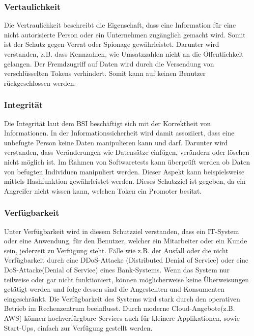 \subsubsection{Vertaulichkeit}
Die Vertraulichkeit beschreibt die Eigenschaft, dass eine Information für eine nicht autorisierte Person oder ein Unternehmen zugänglich gemacht wird. Somit ist der Schutz gegen Verrat oder Spionage gewährleistet. Darunter wird verstanden, z.B. dass Kennzahlen, wie Umsatzzahlen nicht an die Öffentlichkeit gelangen. 
Der Fremdzugriff auf Daten wird durch die Versendung von verschlüsselten Tokens verhindert. Somit kann auf keinen Benutzer rückgeschlossen werden.

\subsubsection{Integrität}
Die Integrität laut dem BSI beschäftigt sich mit der Korrektheit von Informationen. In der Informationssicherheit wird damit assoziiert, dass eine unbefugte Person keine Daten manipulieren kann und darf. Darunter wird verstanden, dass Veränderungen wie Datensätze einfügen, verändern oder löschen nicht möglich ist.
Im Rahmen von Softwaretests kann überprüft werden ob Daten von befugten Individuen manipuliert werden. Dieser Aspekt kann beispielsweise mittels Hashfunktion gewährleistet werden.
Dieses Schutzziel ist gegeben, da ein Angreifer nicht wissen kann, welchen Token ein Promoter besitzt.

\subsubsection{Verfügbarkeit}
Unter Verfügbarkeit wird in diesem Schutzziel verstanden, dass ein IT-System oder eine Anwendung, für den Benutzer, welcher ein Mitarbeiter oder ein Kunde sein, jederzeit zu Verfügung steht. Fälle wie z.B. der Ausfall oder die nicht Verfügbarkeit durch eine DDoS-Attacke (Distributed Denial of Service) oder eine DoS-Attacke(Denial of Service) eines Bank-Systems. Wenn das System nur teilweise oder gar nicht funktioniert, können möglicherweise keine Überweisungen getätigt werden und folge dessen sind die Angestellten und Konsumenten eingeschränkt. 
Die Verfügbarkeit des Systems wird stark durch den operativen Betrieb im Rechenzentrum beeinflusst. Durch moderne Cloud-Angebote(z.B. AWS) können hochverfürgbare Services auch für kleinere Applikationen, sowie Start-Ups, einfach zur Verfügung gestellt werden.

